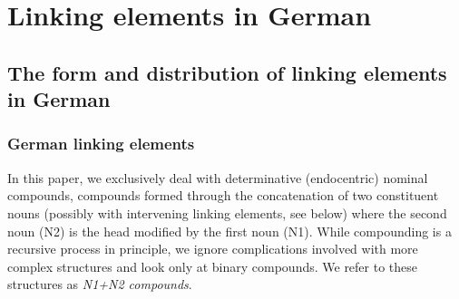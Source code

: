 \section{Linking elements in German}
\label{sec:linkingelementsingerman}

\subsection{The form and distribution of linking elements in German}
\label{sec:theformanddistributionoflinkingelementsingerman}

\subsubsection{German linking elements}

In this paper, we exclusively deal with determinative (endocentric) nominal compounds, \ie compounds formed through the concatenation of two constituent nouns (possibly with intervening linking elements, see below) where the second noun (N2) is the head modified by the first noun (N1).
While compounding is a recursive process in principle, we ignore complications involved with more complex structures and look only at binary compounds.
We refer to these structures as \textit{N1+N2 compounds}.

